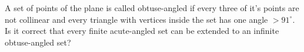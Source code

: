 A set of points of the plane is called  obtuse-angled if every three of it's points are not collinear and every triangle with vertices inside the set has one angle $>91^\circ$. Is it correct that every finite  acute-angled set can be extended to an infinite  obtuse-angled set?
